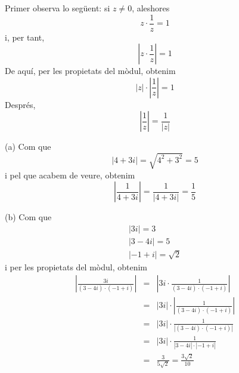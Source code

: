 \begin{solucio}
Primer observa lo següent: si $z\neq 0$, aleshores
\begin{equation*}
z\cdot \frac{1}{z}=1
\end{equation*}
i, per tant,
\begin{equation*}
\left\vert z\cdot \frac{1}{z}\right\vert =1
\end{equation*}
De aquí, per les propietats del mòdul, obtenim
\begin{equation*}
\left\vert z\right\vert \cdot \left\vert \frac{1}{z}\right\vert =1
\end{equation*}
Després,
\begin{equation*}
\left\vert \frac{1}{z}\right\vert =\frac{1}{\left\vert z\right\vert }
\end{equation*}

(a) Com que
\begin{equation*}
\left\vert 4+3i\right\vert =\sqrt{4^{2}+3^{2}}=5
\end{equation*}
i pel que acabem de veure, obtenim
\begin{equation*}
\left\vert \frac{1}{4+3i}\right\vert =\frac{1}{\left\vert 4+3i\right\vert }=
\frac{1}{5}
\end{equation*}

(b) Com que
\begin{equation*}
\begin{array}{l}
\left\vert 3i\right\vert =3 \\
\left\vert 3-4i\right\vert =5 \\
\left\vert -1+i\right\vert =\sqrt{2}
\end{array}
\end{equation*}
i per les propietats del mòdul, obtenim
\begin{eqnarray*}
\left\vert \frac{3i}{(3-4i)\cdot (-1+i)}\right\vert &=&\left\vert 3i\cdot
\frac{1}{(3-4i)\cdot (-1+i)}\right\vert \\
&=&\left\vert 3i\right\vert \cdot \left\vert \frac{1}{(3-4i)\cdot (-1+i)}
\right\vert \\
&=&\left\vert 3i\right\vert \cdot \frac{1}{\left\vert (3-4i)\cdot
(-1+i)\right\vert } \\
&=&\left\vert 3i\right\vert \cdot \frac{1}{\left\vert 3-4i\right\vert \cdot
\left\vert -1+i\right\vert } \\
&=&\frac{3}{5\sqrt{2}}=\frac{3\sqrt{2}}{10}
\end{eqnarray*}
\end{solucio}

